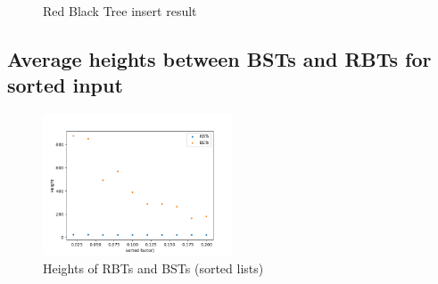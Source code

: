 \documentclass[12pt]{article}
\begin{document}
\begin{figure}[hbt!]
  \centering
  \hfill
  \caption{Red Black Tree insert result}
\end{figure}

\newpage 

\subsection{Average heights between BSTs and RBTs for sorted input}

\begin{figure}[hbt!]
  \centering
  \includegraphics[width=0.5\textwidth]{Figures/sorted_case.png}
  \caption{Heights of RBTs and BSTs (sorted lists)}
   \label{r6}
\end{figure}
\end{document}
